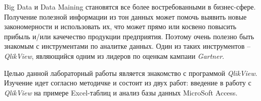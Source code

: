 \Introduction

Big Data и Data Maining становятся все более востребованными в бизнес-сфере.
Получение полезной информации из тон данных может помочь выявить
новые закономерности и использовать их, что может прямо или косвено
повысить прибыль и/или качечество продукции предприятия. Поэтому очень полезно
быть знакомым с инструментами по аналитке данных. Один из таких инструментов --
\textit{QlikView}, являющийся одним из лидеров по оценкам кампаии \textit{Gartner}.

Целью данной лабораторный работы является знакомство с программой \textit{QlikView}.
Изучение идет согласно методичке \cite{klebanov} и состоит из двух работ:
введение в работу с \textit{QlikView} на примере Excel-таблиц и анализ базы данных
MicroSoft Access.
